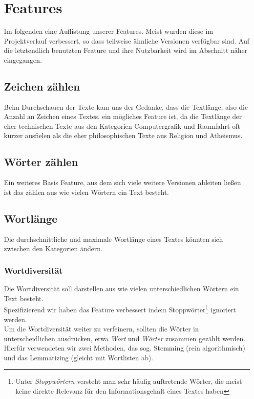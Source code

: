 \documentclass[
	11pt,
	a4paper
]{scrartcl}
\begin{document}
\section{Features}
Im folgenden eine Auflistung unserer Features. Meist wurden diese im Projektverlauf verbessert, so dass teilweise ähnliche
Versionen verfügbar sind. Auf die letztendlich benutzten Feature und ihre Nutzbarkeit wird im Abschnitt \emph{}
näher eingegangen.

\subsection{Zeichen zählen}\label{zeichenzaehlen}
Beim Durchschauen der Texte kam uns der Gedanke, dass die Textlänge, also die Anzahl an Zeichen eines Textes, ein mögliches Feature
ist, da die Textlänge der eher technischen Texte aus den Kategorien Computergrafik und Raumfahrt oft kürzer ausfielen als die eher
philosophischen Texte aus Religion und Atheismus.\\

\subsection{Wörter zählen}\label{woerterZaehlen}
Ein weiteres Basis Feature, aus dem sich viele weitere Versionen ableiten ließen ist das zählen aus wie vielen
Wörtern ein Text besteht.\\

\subsection{Wortlänge}
Die durchschnittliche und maximale Wortlänge eines Textes könnten sich zwischen den Kategorien ändern.

\subsubsection{Wortdiversität}\label{wortdiversitaet}
Die Wortdiversität soll darstellen aus wie vielen unterschiedlichen Wörtern ein Text besteht.\\
Spezifizierend wir haben das Feature verbessert indem Stoppwörter\footnote{Unter \emph{Stoppwörtern}
versteht man sehr häufig auftretende Wörter, die meist keine direkte Relevanz für den Informationsgehalt eines Textes haben} ignoriert werden. \\

Um die Wortdiversität weiter zu verfeinern, sollten die Wörter in unterscheidlichen ausdrücken, etwa \emph{Wort} und \emph{Wörter} zusammen gezählt werden. Hierfür verwendeten wir zwei Methoden, das sog. Stemming (rein algorithmisch) und das Lemmatizing (gleicht mit Wortlisten ab).
\end{document}
